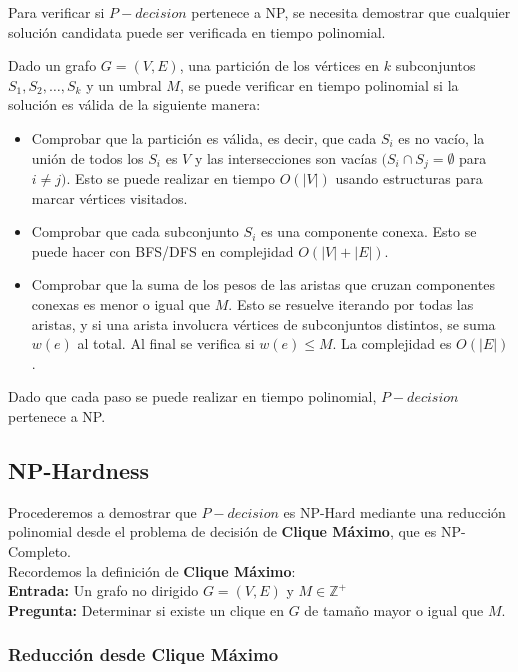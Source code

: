 Para verificar si $P-decision$ pertenece a NP, 
se necesita demostrar que cualquier solución candidata 
puede ser verificada en tiempo polinomial.

Dado un grafo \( G = (V, E) \), una partición de los 
vértices en \( k \) subconjuntos $S_1, S_2, \ldots, S_k$ y un 
umbral \( M \), se puede verificar en tiempo 
polinomial si la solución es válida de la siguiente 
manera:

\begin{itemize}
    \item Comprobar que la partición es válida, es decir, que cada $S_i$ es no vacío, la unión de todos los $S_i$ es $V$ y las intersecciones son vacías $(S_i \cap  S_j = \emptyset$ para $ i \neq j)$. Esto se puede realizar en tiempo \( O(|V|) \) usando estructuras para marcar vértices visitados.
    \item Comprobar que cada subconjunto $S_i$ es una componente conexa. Esto se puede hacer con BFS/DFS en complejidad $O(|V|+|E|)$.
    \item Comprobar que la suma de los pesos de las aristas que cruzan componentes conexas es menor o igual que $M$. Esto se resuelve iterando por todas las aristas, y si una arista involucra vértices de subconjuntos distintos, se suma $w(e)$ al total. Al final se verifica si $w(e) \leq M$. La complejidad es $O(|E|)$.
\end{itemize}

Dado que cada paso se puede realizar en tiempo polinomial, $P-decision$ pertenece a NP.

\subsection{NP-Hardness}
Procederemos a demostrar que $P-decision$ es 
NP-Hard mediante una reducción polinomial desde el 
problema de decisión de \textbf{Clique Máximo}, que es NP-Completo.\\

Recordemos la definición de \textbf{Clique Máximo}:\\
\textbf{Entrada:} Un grafo no dirigido $G = (V, E)$ y $ M \in \mathbb{Z}^{+}$\\
\textbf{Pregunta:} Determinar si existe un clique en $G$ de tamaño mayor o igual que $M$.

\subsubsection{Reducción desde Clique Máximo}


